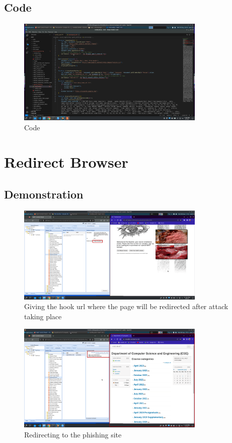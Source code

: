 \documentclass{report}
\begin{document}
\pagebreak

\subsection{Code}
\begin{figure}[!htbp]
    \centering
    \includegraphics[width=0.8\textwidth]{google Fishing/code.png}
    \caption{Code}
    \label{fig:gp4}
\end{figure}

\pagebreak


\section{Redirect Browser}
\subsection{Demonstration}
\begin{figure}[!htbp]
    \centering
    \includegraphics[width=0.8\textwidth]{Redirect Browser/1.png}
    \caption{Giving the hook url where the page will be redirected after attack taking place}
    \label{fig:rb1}
\end{figure}

\begin{figure}[!htbp]
    \centering
    \includegraphics[width=0.8\textwidth]{Redirect Browser/2.png}
    \caption{Redirecting to the phishing site}
    \label{fig:rb2}
\end{figure}
\end{document}
